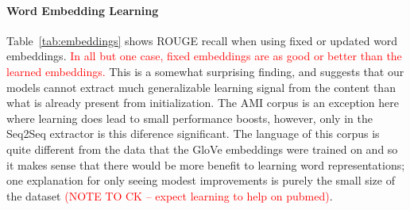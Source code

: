 




\paragraph{Word Embedding Learning}{

Table~\ref{tab:embeddings} shows ROUGE recall
when using fixed or updated word embeddings. 
\textcolor{red}{In all but one case,
fixed embeddings are as good or better than the learned embeddings.}
This is a somewhat surprising finding, and suggests that our models
cannot extract much generalizable learning signal from the content than what 
is already present from initialization. 
The AMI corpus is an exception here where learning does lead to small
performance boosts, however, only in the Seq2Seq extractor is this diference 
significant. The language of this corpus is quite different from the 
data that the GloVe embeddings were trained on and so it makes sense 
that  there would be more benefit to learning word representations; one
explanation for only seeing modest improvements is purely the small size
of the dataset \textcolor{red}{(NOTE TO CK -- expect learning to help on pubmed)}. 


}

